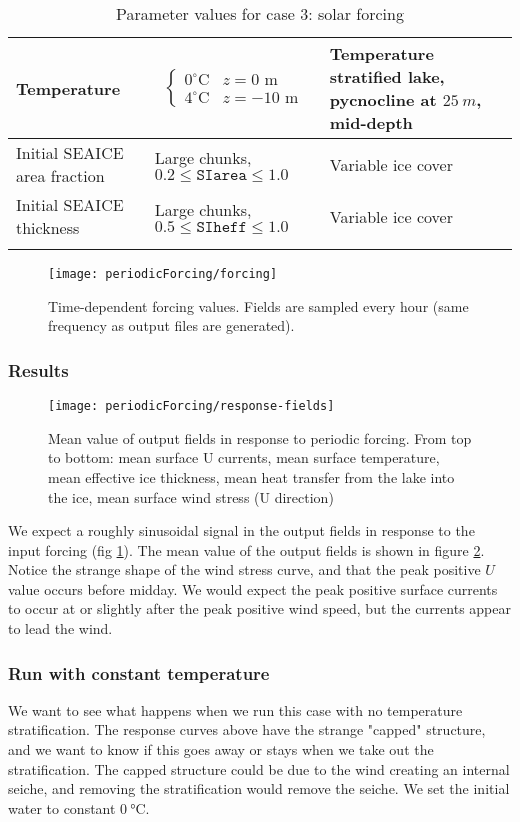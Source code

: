\documentclass[11pt]{article}
\begin{document}
\begin{longtable}{  p{}  p{}  p{}  }
Temperature & \begin{equation*} \begin{cases} 0^{\circ} \text{C} & z = 0 \text{ m} \\ 4 ^{\circ} \text{C} & z = -10 \text{ m}   \end{cases} \end{equation*} & Temperature stratified lake, pycnocline at $\SI{25}{m}$, mid-depth \\ \hline
Initial SEAICE area fraction   & Large chunks, $0.2 \leq \texttt{SIarea} \leq 1.0$ & Variable ice cover \\ \hline
Initial SEAICE thickness    & Large chunks, $0.5 \leq \texttt{SIheff} \leq 1.0$ & Variable ice cover \\ \hline

\caption{Parameter values for case 3: solar forcing}
\label{table:periodicForcing}
\end{longtable}

\begin{figure}[h!]
\texttt{[image: periodicForcing/forcing]}
\caption{Time-dependent forcing values. Fields are sampled every hour (same frequency as output files are generated).}
\label{fig:periodicForcingFields}
\end{figure}

\subsubsection{Results}
\begin{figure}[h!]
\texttt{[image: periodicForcing/response-fields]}
\caption{Mean value of output fields in response to periodic forcing. From top to bottom: mean surface U currents, mean surface temperature, mean effective ice thickness, mean heat transfer from the lake into the ice, mean surface wind stress (U direction)}
\label{fig:periodicForcingResponse}
\end{figure}

We expect a roughly sinusoidal signal in the output fields in response to the input forcing (fig \ref{fig:periodicForcingFields}). The mean value of the output fields is shown in figure \ref{fig:periodicForcingResponse}. Notice the strange shape of the wind stress curve, and that the peak positive $U$ value occurs before midday. We would expect the peak positive surface currents to occur at or slightly after the peak positive wind speed, but the currents appear to lead the wind.

\subsubsection{Run with constant temperature}
We want to see what happens when we run this case with no temperature stratification. The response curves above have the strange "capped" structure, and we want to know if this goes away or stays when we take out the stratification. The capped structure could be due to the wind creating an internal seiche, and removing the stratification would remove the seiche. We set the initial water to constant $\SI{0}{\celsius}$.
\end{document}

